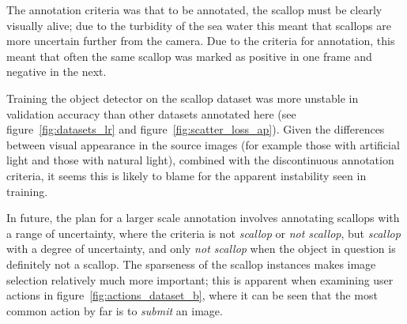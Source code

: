 \begin{itemize}
The annotation criteria was that to be annotated, the scallop must be clearly visually alive; due to the turbidity of the sea water this meant that scallops are more uncertain further from the camera. Due to the criteria for annotation, this meant that often the same scallop was marked as positive in one frame and negative in the next. 

Training the object detector on the scallop dataset was more unstable in validation accuracy than other datasets annotated here (see figure~\ref{fig:datasets_lr} and figure~\ref{fig:scatter_loss_ap}). Given the differences between visual appearance in the source images (for example those with artificial light and those with natural light), combined with the discontinuous annotation criteria, it seems this is likely to blame for the apparent instability seen in training. 

In future, the plan for a larger scale annotation involves annotating scallops with a range of uncertainty, where the criteria is not \emph{scallop} or \emph{not scallop}, but \emph{scallop} with a degree of uncertainty, and only \emph{not scallop} when the object in question is definitely not a scallop. The sparseness of the scallop instances makes image selection relatively much more important; this is apparent when examining user actions in figure~\ref{fig:actions_dataset_b}, where it can be seen that the most common action by far is  to \emph{submit} an image.

\end{itemize}


